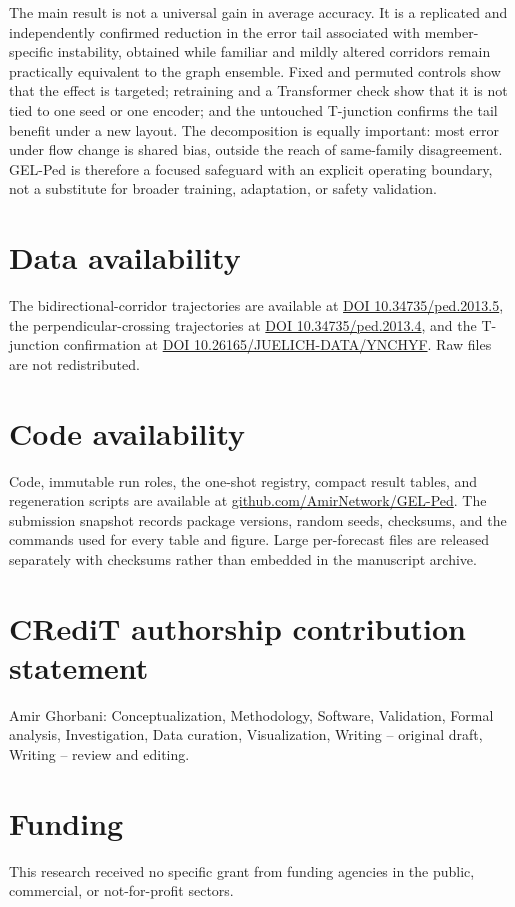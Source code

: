 \documentclass[preprint,11pt,authoryear]{elsarticle}
\begin{document}
The main result is not a universal gain in average accuracy. It is a replicated and independently confirmed reduction in the error tail associated with member-specific instability, obtained while familiar and mildly altered corridors remain practically equivalent to the graph ensemble. Fixed and permuted controls show that the effect is targeted; retraining and a Transformer check show that it is not tied to one seed or one encoder; and the untouched T-junction confirms the tail benefit under a new layout. The decomposition is equally important: most error under flow change is shared bias, outside the reach of same-family disagreement. GEL-Ped is therefore a focused safeguard with an explicit operating boundary, not a substitute for broader training, adaptation, or safety validation.

\section*{Data availability}
The bidirectional-corridor trajectories are available at \href{https://doi.org/10.34735/ped.2013.5}{DOI 10.34735/ped.2013.5}, the perpendicular-crossing trajectories at \href{https://doi.org/10.34735/ped.2013.4}{DOI 10.34735/ped.2013.4}, and the T-junction confirmation at \href{https://doi.org/10.26165/JUELICH-DATA/YNCHYF}{DOI 10.26165/JUELICH-DATA/YNCHYF}. Raw files are not redistributed.

\section*{Code availability}
Code, immutable run roles, the one-shot registry, compact result tables, and regeneration scripts are available at \href{https://github.com/AmirNetwork/GEL-Ped}{github.com/AmirNetwork/GEL-Ped}. The submission snapshot records package versions, random seeds, checksums, and the commands used for every table and figure. Large per-forecast files are released separately with checksums rather than embedded in the manuscript archive.

\section*{CRediT authorship contribution statement}
Amir Ghorbani: Conceptualization, Methodology, Software, Validation, Formal analysis, Investigation, Data curation, Visualization, Writing -- original draft, Writing -- review and editing.

\section*{Funding}
This research received no specific grant from funding agencies in the public, commercial, or not-for-profit sectors.
\end{document}
